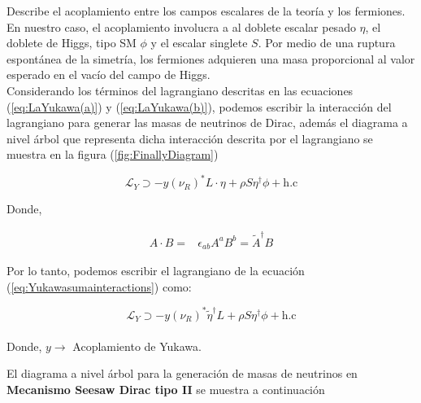 \documentclass[12pt]{article}
\begin{document}
Describe el acoplamiento entre los campos escalares de la teoría y los fermiones. En nuestro caso, el acoplamiento involucra a al doblete escalar pesado $\eta$, el doblete de Higgs, tipo SM $\phi$ y el escalar singlete $S$. Por medio de una ruptura espontánea de la simetría, los fermiones adquieren una masa proporcional al valor esperado en el vacío del campo de Higgs. \\

Considerando los términos del lagrangiano descritas en las ecuaciones (\ref{eq:LaYukawa(a)}) y (\ref{eq:LaYukawa(b)}), podemos escribir la interacción del lagrangiano para generar las masas de neutrinos de Dirac, además el diagrama a nivel árbol que representa dicha interacción descrita por el lagrangiano se muestra en la figura (\ref{fig:FinallyDiagram})

\begin{equation}
    \label{eq:Yukawasumainteractions}
    \mathcal{L}_Y \supset  -y (\nu_R)^* {L}\cdot \eta + \rho S\eta^\dagger\phi + \text{h.c}
\end{equation}

Donde, 

\begin{align}
    \label{eq:cot}
    A\cdot B=&\epsilon_{ab}A^a B^b =\widetilde{A}^\dagger B
\end{align}

Por lo tanto, podemos escribir el lagrangiano de la ecuación  (\ref{eq:Yukawasumainteractions}) como:

\begin{equation}
    \label{eq:Weilalternativo}
    \mathcal{L}_Y \supset  -y (\nu_R)^* \widetilde{\eta}^\dagger {L}+ \rho S\eta^\dagger\phi + \text{h.c}
\end{equation} \\

Donde, $y \rightarrow $ Acoplamiento de Yukawa. 

El diagrama a nivel árbol para la generación de masas de neutrinos en \textbf{Mecanismo Seesaw Dirac tipo II} se muestra a continuación 
\end{document}
